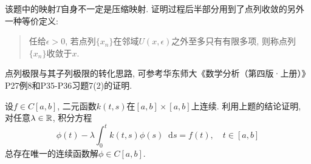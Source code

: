 \documentclass[UTF8,oneside,12pt]{article}  %
\theoremstyle{DingLi1}
\numberwithin{equation}{section}
\newtheorem{remark}{\hskip 2em 注}[section]
\theoremstyle{DingLi2}
\newtheorem{example}{\hskip 2em 问题}[section]
\def\d{\mathop{}\!\mathrm{d}} %
\begin{document}
\begin{remark}
该题中的映射$T$自身不一定是压缩映射.
 证明过程后半部分用到了点列收敛的另外一种等价定义:
  \begin{quote}
  任给$\epsilon>0$, 若点列$\{x_n\}$在邻域$U(x,\epsilon)$之外至多只有有限多项, 则称点列$\{x_n\}$收敛于$x$.
  \end{quote}
点列极限与其子列极限的转化思路, 可参考华东师大《数学分析（第四版·上册）》P27例8和P35-P36习题7(2)的证明.
\end{remark}

\begin{example}[Volterra型线性积分方程解的存在唯一性问题] 设$f\in C[a,b]$, 二元函数$k(t,s)$在$[a,b]\times[a,b]$上连续. 利用上题的结论证明, 对任意$\lambda\in\Bbb{R}$, 积分方程
\begin{equation}\label{Volterra-1}
\phi(t)-\lambda \int_0^t k(t,s)\phi(s)\d s=f(t),\quad t\in [a,b]
\end{equation}
总存在唯一的连续函数解$\phi\in C[a,b]$.
\end{example}
\end{document}
